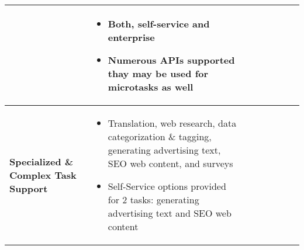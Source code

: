\documentclass{sigchi}
\begin{document}
\begin{sidewaystable*}
\begin{tabular}[h]{| p{1.5cm}| p{2.7cm}| p{2.7cm}| p{2.7cm}| p{2.7cm}| p{2.7cm}| p{2.7cm}| p{2.7cm}|}
{\begin{itemize} 
\end{itemize}
} &
{
\begin{itemize} [noitemsep,nolistsep]
\item  Both, self-service and enterprise
\item  Numerous APIs supported thay may be used for microtasks as well
\end{itemize}
} \\ 
\hline




{\bf Specialized \& Complex Task Support
} & 
{
\begin{itemize} [noitemsep,nolistsep]
\item  Translation, web research, data categorization \& tagging, generating advertising text, SEO web content, and surveys
\item  Self-Service options provided for 2 tasks: generating advertising text and SEO web content


\end{itemize}}
\end{tabular}
\end{sidewaystable*}
\end{document}
